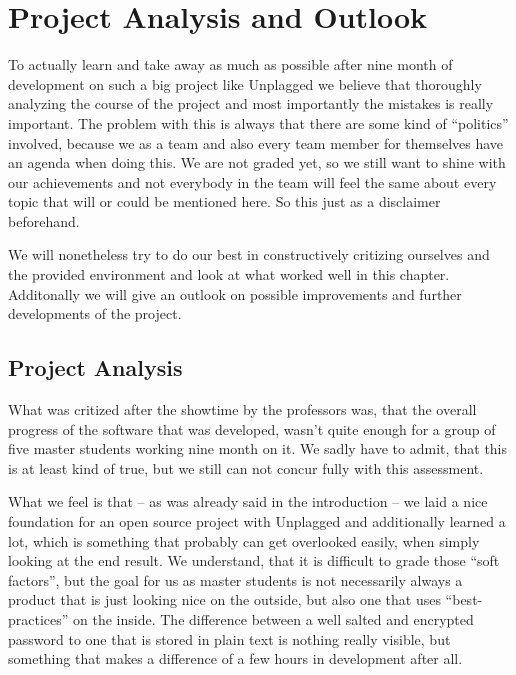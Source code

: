 \chapter{Project Analysis and Outlook}\label{chap:summaryAndOutlook}

To actually learn and take away as much as possible after nine month of development on such a big project like Unplagged we believe that thoroughly analyzing the course of the project and most importantly the mistakes is really important. The problem with this is always that there are some kind of \enquote{politics} involved, because we as a team and also every team member for themselves have an agenda when doing this. We are not graded yet, so we still want to shine with our achievements and not everybody in the team will feel the same about every topic that will or could be mentioned here. So this just as a disclaimer beforehand. 

We will nonetheless try to do our best in constructively critizing ourselves and the provided environment and look at what worked well in this chapter. Additonally we will give an outlook on possible improvements and further developments of the project.

\section{Project Analysis}

What was critized after the showtime by the professors was, that the overall progress of the software that was developed, wasn't quite enough for a group of five master students working nine month on it. We sadly have to admit, that this is at least kind of true, but we still can not concur fully with this assessment.

What we feel is that -- as was already said in the introduction -- we laid a nice foundation for an open source project with Unplagged and additionally learned a lot, which is something that probably can get overlooked easily, when simply looking at the end result. We understand, that it is difficult to grade those \enquote{soft factors}, but the goal for us as master students is not necessarily always a product that is just looking nice on the outside, but also one that uses \enquote{best-practices} on the inside. 
The difference between a well salted and encrypted password to one that is stored in plain text is nothing really visible, but something that makes a difference of a few hours in development after all.

